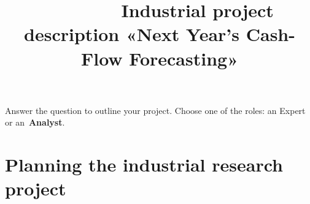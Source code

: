 \documentclass[12pt]{article}
\title{~~~~~~~ Industrial project description \newline «Next Year's Cash-Flow Forecasting»}
\date{}
\begin{document}
\maketitle

Answer the question to outline your project. Choose one of the roles: an {Expert} or an~\textbf{Analyst}.


\section{Planning the industrial research project}
\end{document}
